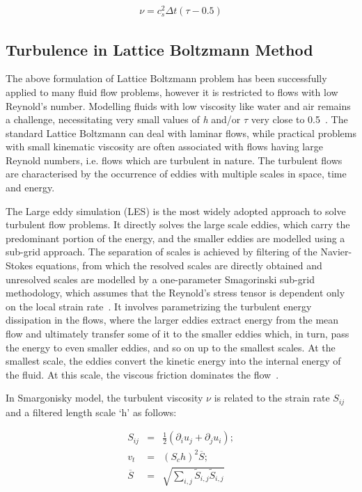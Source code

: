 \begin{align}
\nu=c_s^2\Delta t(\tau-0.5)
\end{align}


\subsection{Turbulence in Lattice Boltzmann Method}

The above formulation of Lattice Boltzmann problem has been successfully 
applied to many fluid flow problems, however it is restricted to flows with low 
Reynold's number. Modelling fluids with low viscosity like water and air 
remains a challenge, necessitating very small values of \textit{h} and/or 
$\tau$ very close to 0.5~\citep{He1997}. The standard Lattice Boltzmann can 
deal with laminar flows, while practical problems with small kinematic 
viscosity are often associated with flows having large Reynold numbers, i.e. 
flows which are turbulent in nature. The turbulent flows are characterised by 
the occurrence of eddies with multiple scales in space, time and energy.

The Large eddy simulation (LES) is the most widely adopted approach to solve 
turbulent flow problems. It directly solves the large scale eddies, which carry 
the predominant portion of the energy, and the smaller eddies are modelled 
using a sub-grid approach. The separation of scales is achieved by filtering of 
the Navier-Stokes equations, from which the resolved scales are directly 
obtained and unresolved scales are modelled by a one-parameter Smagorinski 
sub-grid methodology, which assumes that the Reynold's stress tensor is 
dependent only on the local strain rate~\citep{Smagorinsky1963}. It involves 
parametrizing the turbulent energy dissipation in the flows, where the larger 
eddies extract energy from the mean flow and ultimately transfer some of it to 
the smaller eddies which, in turn, pass the energy to even smaller eddies, and 
so on up to the smallest scales. At the smallest scale, the eddies convert the 
kinetic energy into the internal energy of the fluid. At this scale, the 
viscous friction dominates the flow~\citep{Frisch1995}.

In Smargonisky model, the turbulent viscosity $\nu$ is related to the strain 
rate $S_{ij}$ and a filtered length scale `h' as follows:

\begin{align}
S_{ij} & = &\frac{1}{2}(\partial_i u_j + \partial_j u_i); \\
\mathit{v}_{\mathit{t}} & = & (\mathit{S}_{c}\mathit{h})^{2}\overline{S}; \\
\overline{S} & = & 
\sqrt{\sum\limits_{\mathit{i,j}}{\tilde{S}_{\mathit{i,j}}\tilde{S}_{\mathit{i,j}}}}
\end{align}

